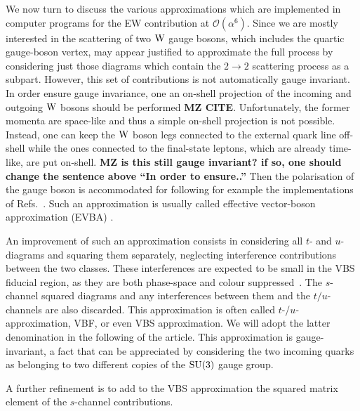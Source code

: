 We now turn to discuss the various approximations which are implemented in computer programs for the EW contribution at
$\mathcal{O}{\left(\alpha^{6}\right)}$. Since we are mostly interested in 
the scattering of two $\text{W}$ gauge bosons, which includes the quartic gauge-boson vertex, may appear justified to approximate the 
full process by considering just those diagrams which contain the $2\rightarrow 2$ scattering process as a subpart.
However, this set of contributions is not automatically gauge invariant. In order ensure gauge invariance, one 
an on-shell projection of the incoming and outgoing $\text{W}$ bosons should be performed {\bf MZ CITE}.
Unfortunately, the former momenta are space-like and thus a simple on-shell projection is not possible.
Instead, one can keep the $\text{W}$ boson legs connected to the external quark line off-shell while the ones connected 
to the final-state leptons, which are already time-like, are put on-shell. {\bf MZ is this still gauge invariant? if so, one should change 
the sentence above ``In order to ensure..''}
Then the polarisation of the gauge boson is accommodated for following for example the implementations of Refs.~\cite{Kuss:1995yv,Accomando:2006hq}.
Such an approximation is usually called effective vector-boson approximation (EVBA) \cite{Dawson:1984gx,Duncan:1985vj,Cahn:1983ip}.

An improvement of such an approximation consists 
in considering all $t$- and $u$- diagrams and squaring them separately, neglecting interference contributions between the two classes.
These interferences are expected to be small in the VBS fiducial region, as they are both phase-space and colour suppressed~\cite{Oleari:2003tc}.
The $s$-channel squared diagrams and any interferences between them and the  $t/u$-channels are also discarded.
This approximation is often called $t$-/$u$- approximation, VBF, or even VBS approximation.
We will adopt the latter denomination in the following of the article.
This approximation is gauge-invariant, a fact that can be appreciated by considering the two incoming quarks as belonging to two different copies of the 
$\rm{SU}(3)$ gauge group.

A further refinement is to add to the VBS approximation the squared matrix element of the $s$-channel contributions.

